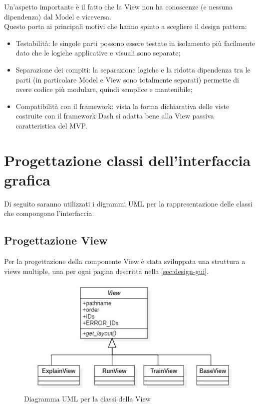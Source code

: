 Un'aspetto importante è il fatto che la View non ha conoscenze (e nessuna dipendenza) dal Model e viceversa. 
\\
Questo porta ai principali motivi che hanno spinto a scegliere il \gls{design pattern}:

\begin{itemize}

\item Testabilità: le singole parti possono essere testate in isolamento più facilmente dato che le logiche applicative e visuali sono separate;

\item Separazione dei compiti: la separazione logiche e la ridotta dipendenza tra le parti (in particolare Model e View sono totalmente separati) permette di avere codice più modulare, quindi semplice e mantenibile;

\item Compatibilità con il framework: vista la forma dichiarativa delle viste costruite con il framework Dash si adatta bene alla View passiva caratteristica del MVP.

\end{itemize}

\section{Progettazione classi dell'interfaccia grafica}
Di seguito saranno utilizzati i digrammi \gls{UML} per la rappresentazione delle classi che compongono l'interfaccia.

\subsection{Progettazione View}
\label{subsec:prog-views}
Per la progettazione della componente View è stata sviluppata una struttura a views multiple, una per ogni pagina descritta nella \autoref{sec:design-gui}.

\begin{figure}[H] 
    \centering 
    \includegraphics[width=0.8\columnwidth]{immagini/uml-views.jpg} 
    \caption{Diagramma UML per la classi della View}
    \label{fig:uml-views}
\end{figure}

